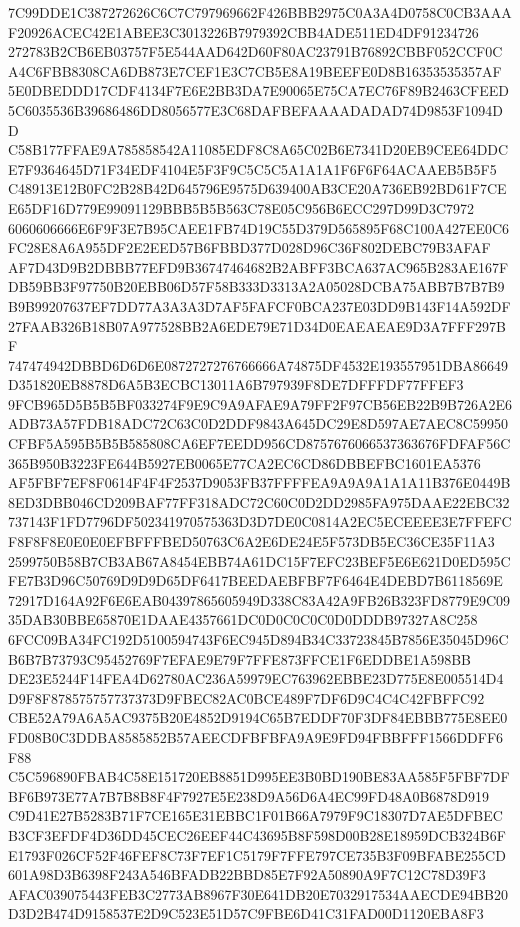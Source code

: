 \documentclass[UTF8,fontset=fandol,zihao=-4,a4paper]{ctexart}
\begin{document}
{{7C99DDE1C387272626C6C7C797969662F426BBB2975C0A3A4D0758C0CB3AAAF20926ACEC42E1ABEE3C3013226B7979392CBB4ADE511ED4DF91234726
272783B2CB6EB03757F5E544AAD642D60F80AC23791B76892CBBF052CCF0CA4C6FBB8308CA6DB873E7CEF1E3C7CB5E8A19BEEFE0D8B16353535357AF
5E0DBEDDD17CDF4134F7E6E2BB3DA7E90065E75CA7EC76F89B2463CFEED5C6035536B39686486DD8056577E3C68DAFBEFAAAADADAD74D9853F1094DD
C58B177FFAE9A785858542A11085EDF8C8A65C02B6E7341D20EB9CEE64DDCE7F9364645D71F34EDF4104E5F3F9C5C5C5A1A1A1F6F6F64ACAAEB5B5F5
C48913E12B0FC2B28B42D645796E9575D639400AB3CE20A736EB92BD61F7CEE65DF16D779E99091129BBB5B5B563C78E05C956B6ECC297D99D3C7972
6060606666E6F9F3E7B95CAEE1FB74D19C55D379D565895F68C100A427EE0C6FC28E8A6A955DF2E2EED57B6FBBD377D028D96C36F802DEBC79B3AFAF
AF7D43D9B2DBBB77EFD9B36747464682B2ABFF3BCA637AC965B283AE167FDB59BB3F97750B20EBB06D57F58B333D3313A2A05028DCBA75ABB7B7B7B9
B9B99207637EF7DD77A3A3A3D7AF5FAFCF0BCA237E03DD9B143F14A592DF27FAAB326B18B07A977528BB2A6EDE79E71D34D0EAEAEAE9D3A7FFF297BF
747474942DBBD6D6D6E0872727276766666A74875DF4532E193557951DBA86649D351820EB8878D6A5B3ECBC13011A6B797939F8DE7DFFFDF77FFEF3
9FCB965D5B5B5BF033274F9E9C9A9AFAE9A79FF2F97CB56EB22B9B726A2E6ADB73A57FDB18ADC72C63C0D2DDF9843A645DC29E8D597AE7AEC8C59950
CFBF5A595B5B5B585808CA6EF7EEDD956CD8757676066537363676FDFAF56C365B950B3223FE644B5927EB0065E77CA2EC6CD86DBBEFBC1601EA5376
AF5FBF7EF8F0614F4F4F2537D9053FB37FFFFEA9A9A9A1A1A11B376E0449B8ED3DBB046CD209BAF77FF318ADC72C60C0D2DD2985FA975DAAE22EBC32
737143F1FD7796DF502341970575363D3D7DE0C0814A2EC5ECEEEE3E7FFEFCF8F8F8E0E0E0EFBFFFBED50763C6A2E6DE24E5F573DB5EC36CE35F11A3
2599750B58B7CB3AB67A8454EBB74A61DC15F7EFC23BEF5E6E621D0ED595CFE7B3D96C50769D9D9D65DF6417BEEDAEBFBF7F6464E4DEBD7B6118569E
72917D164A92F6E6EAB04397865605949D338C83A42A9FB26B323FD8779E9C0935DAB30BBE65870E1DAAE4357661DC0D0C0C0C0D0DDDB97327A8C258
6FCC09BA34FC192D5100594743F6EC945D894B34C33723845B7856E35045D96CB6B7B73793C95452769F7EFAE9E79F7FFE873FFCE1F6EDDBE1A598BB
DE23E5244F14FEA4D62780AC236A59979EC763962EBBE23D775E8E005514D4D9F8F878575757737373D9FBEC82AC0BCE489F7DF6D9C4C4C42FBFFC92
CBE52A79A6A5AC9375B20E4852D9194C65B7EDDF70F3DF84EBBB775E8EE0FD08B0C3DDBA8585852B57AEECDFBFBFA9A9E9FD94FBBFFF1566DDFF6F88
C5C596890FBAB4C58E151720EB8851D995EE3B0BD190BE83AA585F5FBF7DFBF6B973E77A7B7B8B8F4F7927E5E238D9A56D6A4EC99FD48A0B6878D919
C9D41E27B5283B71F7CE165E31EBBC1F01B66A7979F9C18307D7AE5DFBECB3CF3EFDF4D36DD45CEC26EEF44C43695B8F598D00B28E18959DCB324B6F
E1793F026CF52F46FEF8C73F7EF1C5179F7FFE797CE735B3F09BFABE255CD601A98D3B6398F243A546BFADB22BBD85E7F92A50890A9F7C12C78D39F3
AFAC039075443FEB3C2773AB8967F30E641DB20E7032917534AAECDE94BB20D3D2B474D9158537E2D9C523E51D57C9FBE6D41C31FAD00D1120EBA8F3
}}
\end{document}
